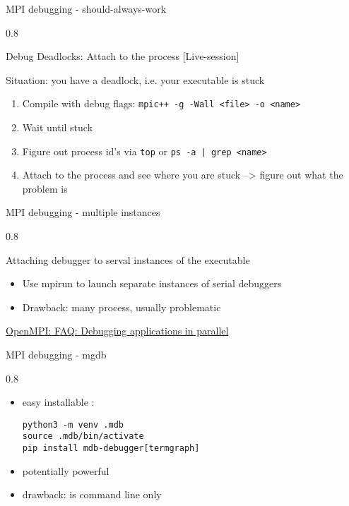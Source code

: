 \documentclass[aspectratio=1610]{beamer}
\newenvironment{centeredblock}[2][0.8\textwidth]
{ %
	\begin{center}
		\begin{varwidth}{#1} %
			\begin{block}{#2}
				\centering
			}
			{ %
			\end{block}
		\end{varwidth}
	\end{center}
}
\begin{document}
	\begin{frame}[fragile]{MPI debugging - should-always-work}
		\begin{centeredblock}{Debug Deadlocks: Attach to the process [Live-session]}
			Situation: you have a deadlock, i.e. your executable is stuck
			\begin{enumerate}
				\item Compile with debug flags: \texttt{mpic++ -g -Wall <file> -o <name>}
				\item Wait until stuck
				\item Figure out process id's via \texttt{top} or \texttt{ps -a | grep <name>}
				\item Attach to the process and see where you are stuck --> figure out what the problem is
			\end{enumerate}
		\end{centeredblock}
	\end{frame}

	\begin{frame}[fragile]{MPI debugging - multiple instances}
		\begin{centeredblock}{Attaching debugger to serval instances of the executable}
			\begin{itemize}
				\item Use mpirun to launch separate instances of serial debuggers
				\item Drawback: many process, usually problematic
			\end{itemize}
			\href{https://www.open-mpi.org/faq/?category=debugging#serial-debuggers}{OpenMPI: FAQ: Debugging applications in parallel}
		\end{centeredblock}
	\end{frame}

	\begin{frame}[fragile]{MPI debugging - mgdb}
		\begin{centeredblock}{}
			\begin{itemize}
				\item easy installable : \begin{verbatim}
python3 -m venv .mdb
source .mdb/bin/activate
pip install mdb-debugger[termgraph]
				\end{verbatim} 
				\item potentially powerful
				\item drawback: is command line only
			\end{itemize}
		\end{centeredblock}
	\end{frame}
\end{document}
